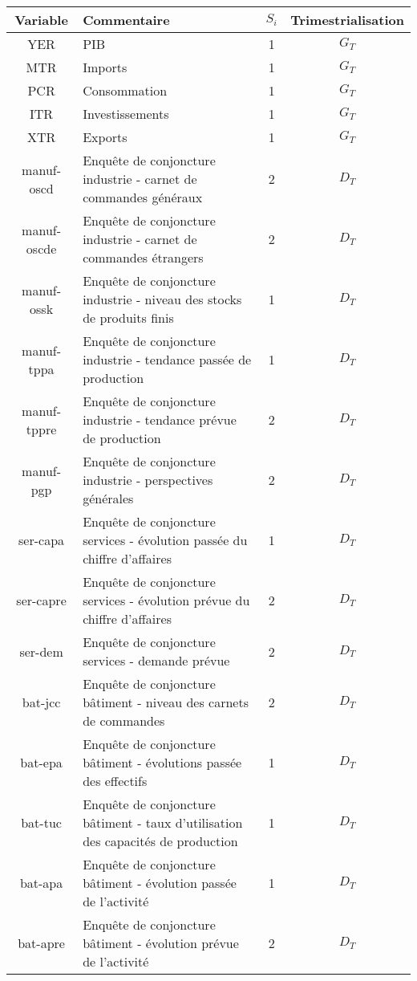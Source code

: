 \documentclass[10pt,french,french]{article}
\begin{document}
\begin{table}[h]{\centering
   \begin{tabular}{ | c | p{10cm} | c|c|}
     \hline
     \textbf{Variable} & \textbf{Commentaire} & $S_i$ &Trimestrialisation\\ \hline
     YER & PIB & 1& $G_T$\\ \hline
     MTR & Imports & 1& $G_T$ \\ \hline
     PCR & Consommation & 1& $G_T$\\ \hline
     ITR & Investissements & 1& $G_T$ \\ \hline
     XTR & Exports & 1& $G_T$ \\ \hline
     manuf-oscd & Enquête de conjoncture industrie -  carnet de commandes généraux & 2& $D_T$ \\ \hline
     manuf-oscde & Enquête de conjoncture industrie - carnet de commandes étrangers & 2& $D_T$ \\ \hline
     manuf-ossk & Enquête de conjoncture industrie - niveau des stocks de produits finis & 1& $D_T$\\ \hline
     manuf-tppa & Enquête de conjoncture industrie - tendance passée de production & 1& $D_T$\\ \hline
     manuf-tppre & Enquête de conjoncture industrie - tendance prévue de production & 2& $D_T$\\ \hline
     manuf-pgp & Enquête de conjoncture industrie - perspectives générales & 2& $D_T$\\ \hline
     ser-capa & Enquête de conjoncture services - évolution passée du chiffre d'affaires & 1& $D_T$\\ \hline
     ser-capre & Enquête de conjoncture services - évolution prévue du chiffre d'affaires & 2& $D_T$\\ \hline
     ser-dem & Enquête de conjoncture services - demande prévue  & 2& $D_T$\\ \hline
     bat-jcc & Enquête de conjoncture bâtiment - niveau des carnets de commandes & 2& $D_T$ \\ \hline
     bat-epa & Enquête de conjoncture bâtiment - évolutions passée des effectifs & 1& $D_T$\\ \hline
     bat-tuc & Enquête de conjoncture bâtiment - taux d'utilisation des capacités de production & 1& $D_T$\\ \hline
     bat-apa & Enquête de conjoncture bâtiment - évolution passée de l'activité & 1 & $D_T$\\ \hline
     bat-apre & Enquête de conjoncture bâtiment -  évolution prévue de l'activité & 2& $D_T$\\ \hline

\end{tabular}}
\end{table}
\end{document}
